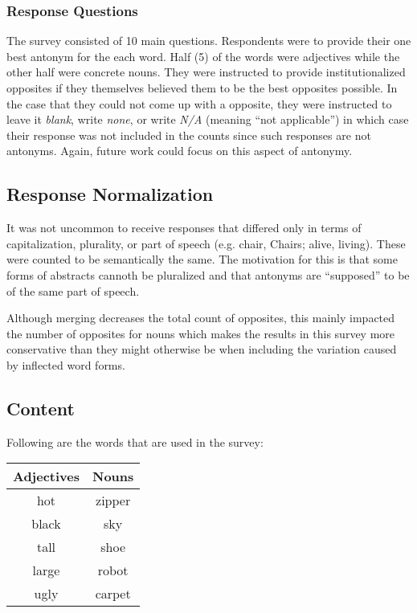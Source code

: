 
\subsubsection{Response Questions}
The survey consisted of 10 main questions.  Respondents were to provide their one best antonym for the each word. Half (5) of the words were adjectives while the other half were concrete nouns.  They were instructed to provide institutionalized opposites if they themselves believed them to be the best opposites possible. In the case that they could not come up with a opposite, they were instructed to leave it \textit{blank}, write \textit{none}, or write \textit{N/A} (meaning ``not applicable'') in which case their response was not included in the counts since such responses are not antonyms.  Again, future work could focus on this aspect of antonymy.  

\subsection{Response Normalization} It was not uncommon to receive responses that differed only in terms of capitalization, plurality, or part of speech (e.g. chair, Chairs; alive, living).  These were counted to be semantically the same.  The motivation for this is that some forms of abstracts cannoth be pluralized and that antonyms are ``supposed'' to be of the same part of speech.

Although merging decreases the total count of opposites, this mainly impacted the number of opposites for nouns which makes the results in this survey more conservative than they might otherwise be when including the variation caused by inflected word forms.  

\subsection{Content} 
Following are the words that are used in the survey:
	\begin{center}
		\begin{tabular}{|c|c|}	\hline
			\textbf{Adjectives} & \textbf{Nouns} 	\\ \hline
			hot					&  zipper 			\\ \hline
			black				&  sky				\\ \hline
			tall				&  shoe				\\ \hline
			large				&  robot			\\ \hline
			ugly				&  carpet			\\ \hline
		\end{tabular}
	\end{center}

